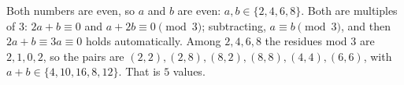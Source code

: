 Both numbers are even, so $a$ and $b$ are even: $a,b\in\{2,4,6,8\}$. Both are multiples of $3$: $2a+b\equiv0$ and $a+2b\equiv0\pmod3$; subtracting, $a\equiv b\pmod3$, and then $2a+b\equiv3a\equiv0$ holds automatically. Among $2,4,6,8$ the residues mod $3$ are $2,1,0,2$, so the pairs are $(2,2),(2,8),(8,2),(8,8),(4,4),(6,6)$, with $a+b\in\{4,10,16,8,12\}$. That is $\boxed{5}$ values.
